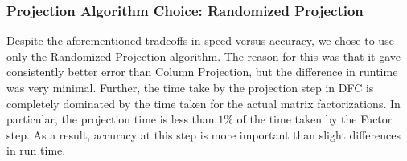 \subsubsection{Projection Algorithm Choice: Randomized Projection}
Despite the aforementioned tradeoffs in speed versus accuracy, we chose to use only the Randomized Projection algorithm. The reason for this was that it gave consistently better error than Column Projection, but the difference in runtime was very minimal. Further, the time take by the projection step in DFC is completely dominated by the time taken for the actual matrix factorizations. In particular, the projection time is less than $1\%$ of the time taken by the Factor step. As a result, accuracy at this step is more important than slight differences in run time. 